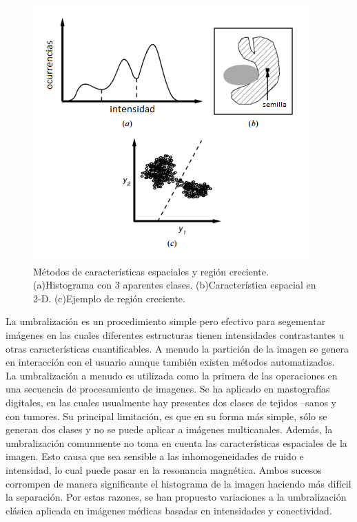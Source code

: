 \documentclass[12pt]{report}
\begin{document}
\begin{figure}[H]
\centering
\includegraphics[width = 10 cm, height = 10 cm]{umbral}
\caption{Métodos de características espaciales y región creciente. (a)Histograma con 3 aparentes clases. (b)Característica espacial en 2-D. (c)Ejemplo de región creciente.}
\end{figure}

La umbralización es un procedimiento simple pero efectivo para segementar imágenes en las cuales diferentes estructuras tienen intensidades contrastantes u otras características cuantificables. A menudo la partición de la imagen se genera en interacción con el usuario aunque también existen métodos automatizados.\\

La umbralización a menudo es utilizada como la primera de las operaciones en una secuencia de procesamiento de imagenes. Se ha aplicado en mastografías digitales, en las cuales usualmente hay presentes dos clases de tejidos --sanos y con tumores. Su principal limitación, es que en su forma más simple, sólo se generan dos clases y no se puede aplicar a imágenes multicanales. Además, la umbralización comunmente no toma en cuenta las características espaciales de la imagen. Esto causa que sea sensible a las inhomogeneidades de ruido e intensidad, lo cual puede pasar en la resonancia magnética. Ambos sucesos corrompen de manera significante el histograma de la imagen haciendo más difícil la separación. Por estas razones, se han propuesto variaciones a la umbralización clásica aplicada en imágenes médicas basadas en intensidades y conectividad. \cite{metodos}
\end{document}
